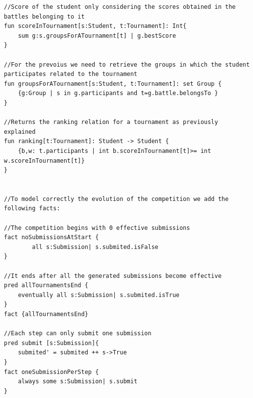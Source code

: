 \begin{lstlisting}[language=alloy]
//Score of the student only considering the scores obtained in the battles belonging to it
fun scoreInTournament[s:Student, t:Tournament]: Int{
	sum g:s.groupsForATournament[t] | g.bestScore
}

//For the prevoius we need to retrieve the groups in which the student participates related to the tournament
fun groupsForATournament[s:Student, t:Tournament]: set Group {
	{g:Group | s in g.participants and t=g.battle.belongsTo }
}

//Returns the ranking relation for a tournament as previously explained
fun ranking[t:Tournament]: Student -> Student {
	{b,w: t.participants | int b.scoreInTournament[t]>= int w.scoreInTournament[t]}
}


//To model correctly the evolution of the competition we add the following facts:

//The competition begins with 0 effective submissions
fact noSubmissionsAtStart {
		all s:Submission| s.submited.isFalse
}

//It ends after all the generated submissions become effective
pred allTournamentsEnd {
	eventually all s:Submission| s.submited.isTrue
}
fact {allTournamentsEnd}

//Each step can only submit one submission
pred submit [s:Submission]{
	submited' = submited ++ s->True
}
fact oneSubmissionPerStep {
	always some s:Submission| s.submit
}

\end{lstlisting}

